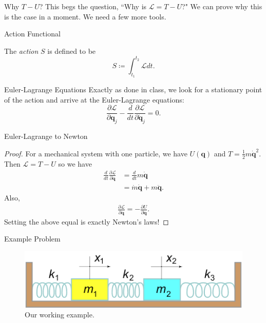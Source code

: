 \documentclass[usenames,dvipsnames]{beamer}
\theoremstyle{definition}
\theoremstyle{theorem}
\begin{document}
        \begin{frame}{Why $T-U$?}
            This begs the question, ``Why is $\mathcal{L}=T-U$?" We can prove why this is the case in a moment. We need a few more tools.
        \end{frame}
        
        \begin{frame}{Action Functional}
            \begin{definition}
                The \emph{action} $S$ is defined to be
                \[
                S\coloneqq \int_{t_1}^{t_2}\mathcal{L}dt.
                \]
            \end{definition}
        \end{frame}
        
        \begin{frame}{Euler-Lagrange Equations}
            Exactly as done in class, we look for a stationary point of the action and arrive at the Euler-Lagrange equations:
            \[
            \frac{\partial \mathcal{L}}{\partial \mathbf{q}_j}-\frac{d}{dt}\frac{\partial \mathcal{L}}{\partial \dot{\mathbf{q}}_j}=0.
            \]
        \end{frame}
        
        \begin{frame}{Euler-Lagrange to Newton}
            \begin{proof}
                For a mechanical system with one particle, we have $U(\mathbf{q})$ and $T=\frac{1}{2}m\mathbf{\dot{q}}^2$.  Then $\mathcal{L}=T-U$ so we have
                \begin{align*}
                \frac{d}{dt}\frac{\partial \mathcal{L}}{\partial \mathbf{\dot{q}}}&=\frac{d}{dt}m\mathbf{\dot{q}}\\
                &= \dot{m}\mathbf{\dot{q}}+m\mathbf{\ddot{q}}.
                \end{align*}
                Also,
                \begin{align*}
                    \frac{\partial \mathcal{L}}{\partial \mathbf{q}}=-\frac{\partial U}{\partial \mathbf{q}}.
                \end{align*}
                Setting the above equal is exactly Newton's laws!
            \end{proof}
        \end{frame}
    
        \begin{frame}{Example Problem}
            \begin{figure}
                \centering
                \includegraphics[width=.95\textwidth]{Lagrangian_Mechanics/2mass_3spring.png}
                \caption{Our working example.}
                \label{fig:my_label}
            \end{figure}
        \end{frame}
        
\end{document}
